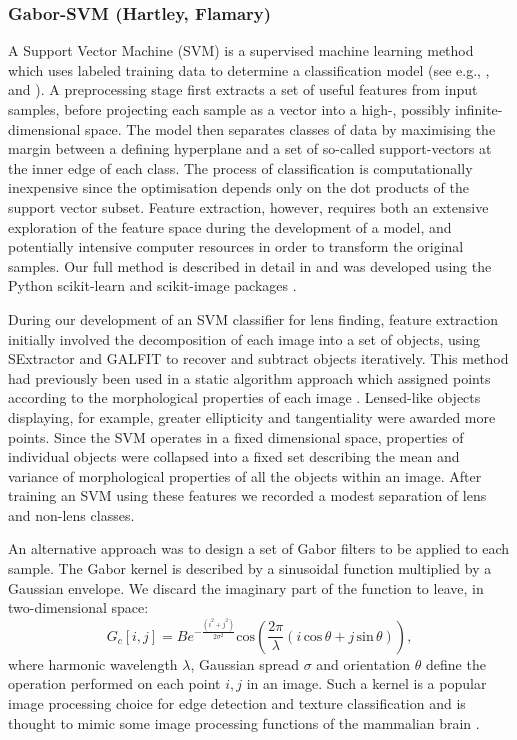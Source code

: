 \documentclass[useAMS,usenatbib]{mnras}
\begin{document}
\subsubsection{Gabor-SVM (Hartley, Flamary)}

A Support Vector Machine (SVM) is a supervised machine learning method which uses labeled training data to determine a classification model (see e.g., \citet{vapnik79estimation}, \citet{Cortes1995} and \citet{Burges1998}). A preprocessing stage first extracts a set of useful features from input samples, before projecting each sample as a vector into a high-, possibly infinite-dimensional space. The model then separates classes of data by maximising the margin between a defining hyperplane and a set of so-called support-vectors at the inner edge of each class. The process of classification is computationally inexpensive since the optimisation depends only on the dot products of the support vector subset. Feature extraction, however,  requires both an extensive exploration of the feature space during the development of a model, and potentially intensive computer resources in order to transform the original samples. Our full method is described in detail in \citet{hartley2017support} and was developed using the Python scikit-learn and scikit-image packages \citep{scikit-learn,scikit-image}.

During our development of an SVM classifier for lens finding, feature extraction initially involved the decomposition of each image into a set of objects, using SExtractor \citep{1996A&AS..117..393B} and GALFIT \citep{2002AJ....124..266P} to recover and subtract objects iteratively. This method had previously been used in a static algorithm approach which assigned points according to the morphological properties of each image \citep[see][]{2014A&A...566A..63J}. Lensed-like objects displaying, for example, greater ellipticity and tangentiality were awarded more points. Since the SVM operates in a fixed dimensional space,  properties of individual objects were collapsed into a fixed set describing the mean and variance of morphological properties of all the objects within an image. After training an SVM using these features we recorded a modest separation of lens and non-lens classes.

An alternative approach was to design a set of Gabor filters to be applied to each sample. The Gabor kernel is described by a sinusoidal function multiplied by a Gaussian envelope. We discard the imaginary part of the function to leave, in two-dimensional space:
\begin{equation}
G_c[i,j]=Be^{-\frac{(i^2+j^2)}{2\sigma^2}} \mathrm{cos}\left(\frac{2\pi}{\lambda} (i\, \mathrm{cos} \, \theta + j\, \mathrm{sin} \,\theta)\right),
\end{equation}
where harmonic wavelength $\lambda$, Gaussian spread  $\sigma$ and orientation $\theta$ define the operation performed on each point $i,j$ in an image. Such a kernel is a popular image processing choice for edge detection and texture classification \citep[e.g.][]{Feichtinger98a,Springer-verlag97computationalmodels} and is thought to mimic some image processing functions of the mammalian brain \citep{Jones1233}.
\end{document}
